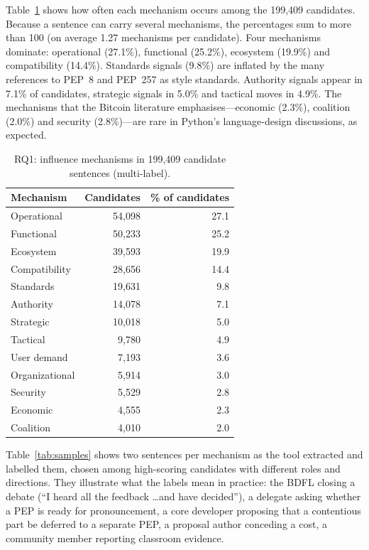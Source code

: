 \documentclass[sigconf,screen]{acmart}
\begin{document}
Table~\ref{tab:rq1} shows how often each mechanism occurs among the 199,409 candidates. Because a sentence can carry several mechanisms, the percentages sum to more than 100 (on average 1.27 mechanisms per candidate). Four mechanisms dominate: operational (27.1\%), functional (25.2\%), ecosystem (19.9\%) and compatibility (14.4\%). Standards signals (9.8\%) are inflated by the many references to PEP~8 and PEP~257 as style standards. Authority signals appear in 7.1\% of candidates, strategic signals in 5.0\% and tactical moves in 4.9\%. The mechanisms that the Bitcoin literature emphasises---economic (2.3\%), coalition (2.0\%) and security (2.8\%)---are rare in Python's language-design discussions, as expected.

\begin{table}[t]
\caption{RQ1: influence mechanisms in 199,409 candidate sentences (multi-label).}
\label{tab:rq1}
\begin{tabular}{lrr}
\toprule
Mechanism & Candidates & \% of candidates \\
\midrule
Operational & 54,098 & 27.1 \\
Functional & 50,233 & 25.2 \\
Ecosystem & 39,593 & 19.9 \\
Compatibility & 28,656 & 14.4 \\
Standards & 19,631 & 9.8 \\
Authority & 14,078 & 7.1 \\
Strategic & 10,018 & 5.0 \\
Tactical & 9,780 & 4.9 \\
User demand & 7,193 & 3.6 \\
Organizational & 5,914 & 3.0 \\
Security & 5,529 & 2.8 \\
Economic & 4,555 & 2.3 \\
Coalition & 4,010 & 2.0 \\
\bottomrule
\end{tabular}
\end{table}

Table~\ref{tab:samples} shows two sentences per mechanism as the tool extracted and labelled them, chosen among high-scoring candidates with different roles and directions. They illustrate what the labels mean in practice: the BDFL closing a debate (``I heard all the feedback \ldots and have decided''), a delegate asking whether a PEP is ready for pronouncement, a core developer proposing that a contentious part be deferred to a separate PEP, a proposal author conceding a cost, a community member reporting classroom evidence.
\end{document}
